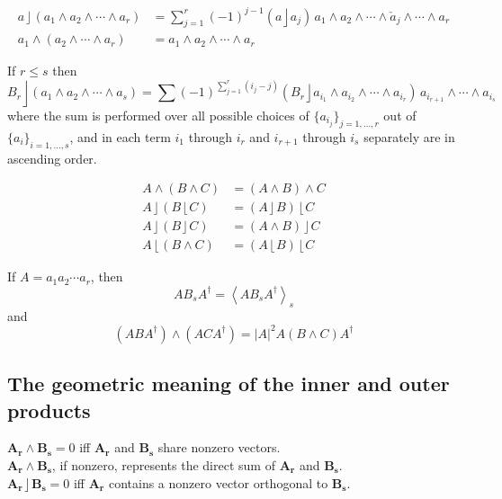 \documentclass{utarticle}
\newcommand{\bl}[1]{\ensuremath{\bm{#1}}}
\DeclareMathOperator{\lin}{\rfloor}
\DeclareMathOperator{\rin}{\lfloor}
\DeclareMathOperator{\out}{\wedge}
\newcommand{\rev}[1]{\ensuremath{#1^\dagger}}
\newcommand{\grade}[2][]{\ensuremath{\left\langle #2 \right\rangle_{#1}}}
\begin{document}
\begin{align}
a \lin (a_1 \out a_2 \out \dotsb \out a_r) & = \sum_{j=1}^r (-1)^{j-1} 
    (a \lin a_j) \, a_1 \out a_2 \out \dotsb \out \check{a}_j \out 
    \dotsb \out a_r  \\
a_1 \out (a_2 \out \dotsb \out a_r) & = a_1 \out a_2 \out \dotsb \out a_r
\end{align}

\noindent If $r \leq s$ then
\begin{equation}
B_r \lin (a_1 \out a_2 \out \dotsb \out a_s) = \sum
    (-1)^{\sum_{j=1}^r (i_j - j)} (B_r \lin a_{i_1} \out a_{i_2} \out 
    \dotsb \out a_{i_r}) \, a_{i_{r+1}} \out \dotsb \out 
    a_{i_s}
\end{equation}
where the sum is performed over all possible choices of $\{a_{i_j}\}_{j=1, \dotsc,r}$ 
out of $\{a_i\}_{i=1,\dotsc,s}$, and in each term $i_1$ through 
$i_r$ and $i_{r+1}$ through $i_s$ separately are in ascending order.

\begin{align}
A \out (B \out C) & = (A \out B) \out C \\
A \lin (B \rin C) & = (A \lin B) \rin C  \\
A \lin (B \lin C) & = (A \out B) \lin C  \\
A \rin (B \out C) & = (A \rin B) \rin C
\end{align}

\noindent If $A = a_1 a_2 \dotsb a_r$, then 
\begin{equation} A B_s \rev{A} = \grade[s]{A B_s \rev{A}} \end{equation}
and
\begin{equation} (A B \rev{A}) \out (A C \rev{A}) = |A|^2 A (B \out C) \rev{A} \end{equation}

\subsection{The geometric meaning of the inner and outer products}
\label{app:geomeaninout}

$\bl{A_r} \out \bl{B_s} = 0$ iff \bl{A_r} and \bl{B_s} share nonzero vectors. \\

\noindent $\bl{A_r} \out \bl{B_s}$, if nonzero, represents the direct sum of \bl{A_r} and \bl{B_s}. \\

\noindent $\bl{A_r} \lin \bl{B_s} = 0$ iff \bl{A_r} contains a nonzero vector orthogonal to \bl{B_s}. \\
 
\end{document}
